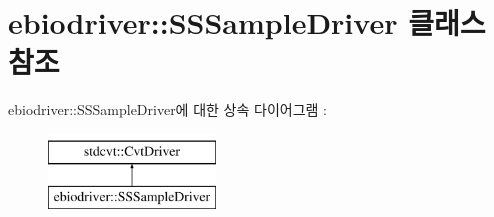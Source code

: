 \hypertarget{classebiodriver_1_1SSSampleDriver}{}\section{ebiodriver\+:\+:S\+S\+Sample\+Driver 클래스 참조}
\label{classebiodriver_1_1SSSampleDriver}
ebiodriver\+:\+:S\+S\+Sample\+Driver에 대한 상속 다이어그램 \+: \begin{figure}[H]
\begin{center}
\leavevmode
\includegraphics[height=2.000000cm]{classebiodriver_1_1SSSampleDriver}
\end{center}
\end{figure}
